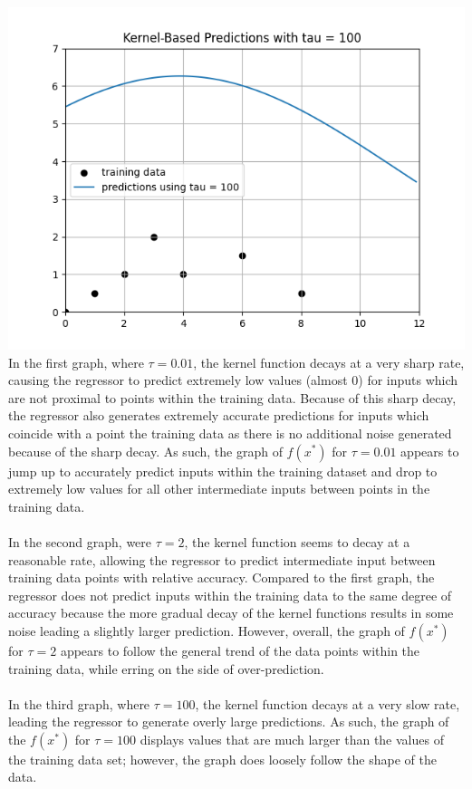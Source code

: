 \documentclass[submit]{harvardml}
\begin{document}
\includegraphics[scale=0.75]{tau100.png} \\
\noin In the first graph, where $\tau = 0.01$, the kernel function decays at a very sharp rate, causing the regressor to predict extremely low values (almost 0) for inputs which are not proximal to points within the training data. Because of this sharp decay, the regressor also generates extremely accurate predictions for inputs which coincide with a point the training data as there is no additional noise generated because of the sharp decay. As such, the graph of $f(x^*)$ for $\tau = 0.01$ appears to jump up to accurately predict inputs within the training dataset and drop to extremely low values for all other intermediate inputs between points in the training data. \\ \\
\noin In the second graph, were $\tau = 2$, the kernel function seems to decay at a reasonable rate, allowing the regressor to predict intermediate input between training data points with relative accuracy. Compared to the first graph, the regressor does not predict inputs within the training data to the same degree of accuracy because the more gradual decay of the kernel functions results in some noise leading a slightly larger prediction. However, overall, the graph of $f(x^*)$ for $\tau = 2$ appears to follow the general trend of the data points within the training data, while erring on the side of over-prediction. \\ \\
\noin In the third graph, where $\tau = 100$, the kernel function decays at a very slow rate, leading the regressor to generate overly large predictions. As such, the graph of the $f(x^*)$ for $\tau = 100$ displays values that are much larger than the values of the training data set; however, the graph does loosely follow the shape of the data. \\ \\
\end{document}
